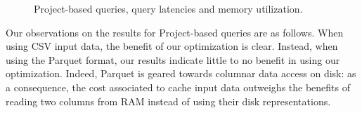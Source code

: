 \begin{figure}[ht]
	\centering



   \caption{Project-based queries, query latencies and memory utilization.}
   \label{fig:query2}
\end{figure}

Our observations on the results for Project-based queries are as follows. 
When using CSV input data, the benefit of our optimization is clear. Instead, when using the Parquet format, our results indicate little to no benefit in using our optimization. Indeed, Parquet is geared towards columnar data access on disk: as a consequence, the cost associated to cache input data outweighs the benefits of reading two columns from RAM instead of using their disk representations.

